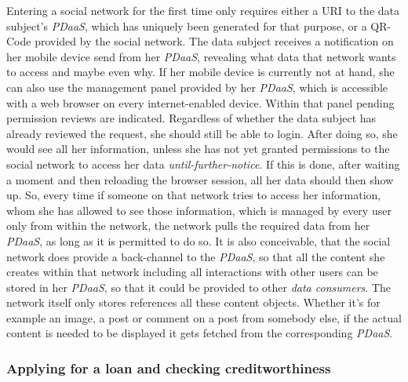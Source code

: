 \documentclass[12pt,english,a4paper,titlepage,cleardoublepage=empty,dottedtoc]{report}
\begin{document}
Entering a social network for the first time only requires either a URI
to the data subject's \emph{PDaaS}, which has uniquely been generated
for that purpose, or a QR-Code provided by the social network. The data
subject receives a notification on her mobile device send from her
\emph{PDaaS}, revealing what data that network wants to access and maybe
even why. If her mobile device is currently not at hand, she can also
use the management panel provided by her \emph{PDaaS}, which is
accessible with a web browser on every internet-enabled device. Within
that panel pending permission reviews are indicated. Regardless of
whether the data subject has already reviewed the request, she should
still be able to login. After doing so, she would see all her
information, unless she has not yet granted permissions to the social
network to access her data \emph{until-further-notice}. If this is done,
after waiting a moment and then reloading the browser session, all her
data should then show up. So, every time if someone on that network
tries to access her information, whom she has allowed to see those
information, which is managed by every user only from within the
network, the network pulls the required data from her \emph{PDaaS}, as
long as it is permitted to do so. It is also conceivable, that the
social network does provide a back-channel to the \emph{PDaaS}, so that
all the content she creates within that network including all
interactions with other users can be stored in her \emph{PDaaS}, so that
it could be provided to other \emph{data consumers}. The network itself
only stores references all these content objects. Whether it's for
example an image, a post or comment on a post from somebody else, if the
actual content is needed to be displayed it gets fetched from the
corresponding \emph{PDaaS}.

\subsubsection{Applying for a loan and checking
creditworthiness}\label{applying-for-a-loan-and-checking-creditworthiness}
\end{document}
